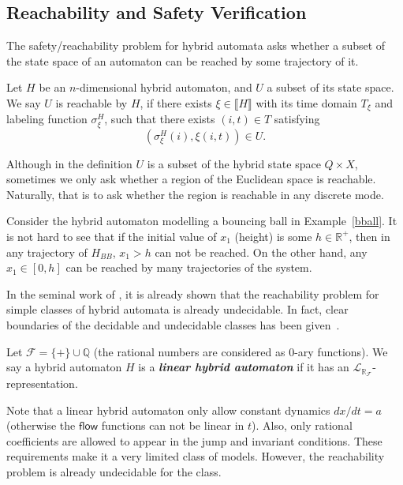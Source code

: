 \documentclass[envcountsect]{llncs}
\newcommand{\flow}{\mathsf{flow}}
\newcommand{\lrf}{\mathcal{L}_{\mathbb{R}_{\mathcal{F}}}}
\begin{document}
\subsection{Reachability and Safety Verification}

The safety/reachability problem for hybrid automata asks whether a subset of 
the state space of an automaton can be reached by some trajectory of it. 
\begin{definition}[Reachability]\label{reachability}
Let $H$ be an $n$-dimensional hybrid automaton, and $U$ a subset of its state
space.  We say $U$ is reachable by $H$, if there exists $\xi\in\llbracket H
\rrbracket$ with its time domain $T_{\mathcal{\xi}}$ and labeling function
$\sigma_{\xi}^H$, such that there exists $(i,t)\in T$ satisfying
$$(\sigma^H_{\xi}(i), \xi(i,t))\in U.$$
\end{definition}

\begin{remark}
Although in the definition $U$ is a subset of the hybrid state space $Q\times
X$,  sometimes we only ask whether a region of the Euclidean space is reachable.
Naturally, that is to ask whether the region is reachable in any discrete mode. 
\end{remark}

\begin{example}
Consider the hybrid automaton modelling a bouncing ball in Example~\ref{bball}. 
It is not hard to see that if the initial value of $x_1$ (height) is some $h\in
\mathbb{R}^+$, then in any trajectory of $H_{BB}$, $x_1> h$ can not be reached.
On the other hand, any $x_1\in [0, h]$ can be reached by many trajectories of
the system. 
\end{example}

In the seminal work of \cite{DBLP:conf/rex/AlurD91,DBLP:conf/hybrid/AlurCHH92}, 
it is already shown that the reachability problem for simple classes of hybrid
automata is already undecidable. In fact, clear boundaries of the decidable and
undecidable classes has been given~\cite{DBLP:journals/jcss/HenzingerKPV98}.

\begin{definition}
Let $\mathcal{F} = \{+\}\cup \mathbb{Q}$ (the rational numbers are considered as
 0-ary functions). We say a hybrid automaton $H$ is a {\bf\em linear hybrid
automaton} if it has an $\lrf$-representation. 
\end{definition}

Note that a linear hybrid automaton only allow constant dynamics $dx/dt = a$ 
(otherwise the $\flow$ functions can not be linear in $t$). Also, only rational
coefficients are allowed to appear in the jump and invariant conditions. These
requirements make it a very limited class of models. However, the reachability
problem is already undecidable for the class. 
\end{document}
